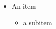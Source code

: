 \documentclass{beamer}
\begin{document}
\begin{frame}

    \begin{itemize}
        \item An item
        \begin{itemize}
        \item a subitem
        \end{itemize}
    \end{itemize}

\end{frame} 
\end{document}
